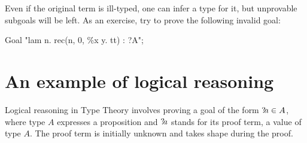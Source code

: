 Even if the original term is ill-typed, one can infer a type for it, but
unprovable subgoals will be left.  As an exercise, try to prove the
following invalid goal:
\begin{ttbox}
Goal "lam n. rec(n, 0, \%x y. tt) : ?A";
\end{ttbox}



\section{An example of logical reasoning}
Logical reasoning in Type Theory involves proving a goal of the form
${?\!a}\in A$, where type $A$ expresses a proposition and ${?\!a}$ stands
for its proof term, a value of type $A$.  The proof term is initially
unknown and takes shape during the proof.  

